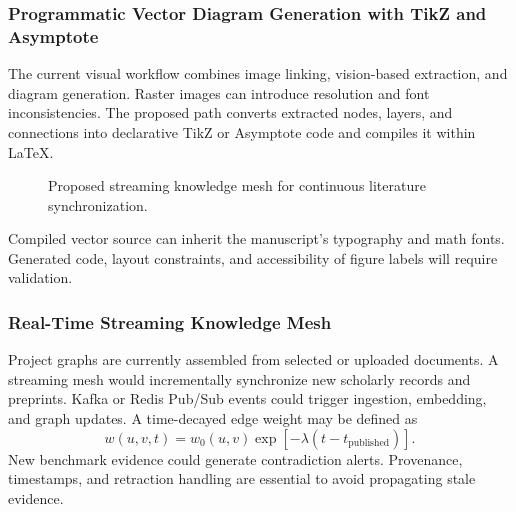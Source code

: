 \documentclass[conference]{IEEEtran}
\begin{document}
\subsubsection{Programmatic Vector Diagram Generation with TikZ and Asymptote}
The current visual workflow combines image linking, vision-based extraction, and diagram generation. Raster images can introduce resolution and font inconsistencies. The proposed path converts extracted nodes, layers, and connections into declarative TikZ or Asymptote code and compiles it within LaTeX.
\begin{figure}[!t]
\centering
\caption{Proposed native vector diagram compilation flow.}\label{fig:vector-flow}
\vspace{3.5mm}
\caption{Proposed streaming knowledge mesh for continuous literature synchronization.}\label{fig:stream-mesh}
\end{figure}
Compiled vector source can inherit the manuscript's typography and math fonts. Generated code, layout constraints, and accessibility of figure labels will require validation.
\subsubsection{Real-Time Streaming Knowledge Mesh}
Project graphs are currently assembled from selected or uploaded documents. A streaming mesh would incrementally synchronize new scholarly records and preprints.
Kafka or Redis Pub/Sub events could trigger ingestion, embedding, and graph updates. A time-decayed edge weight may be defined as
\begin{equation}w(u,v,t)=w_0(u,v)\exp[-\lambda(t-t_{\mathrm{published}})].\end{equation}
New benchmark evidence could generate contradiction alerts. Provenance, timestamps, and retraction handling are essential to avoid propagating stale evidence.
\end{document}
